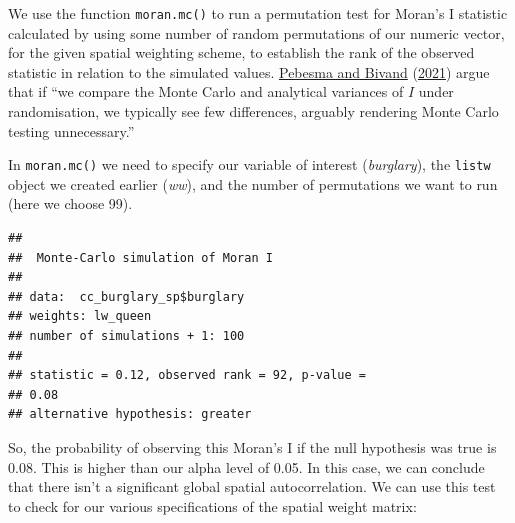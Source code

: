 \documentclass[
  krantz2]{krantz}
\makeatletter
\newenvironment{Shaded}{\begin{snugshade}}{\end{snugshade}}
\newcommand{\AttributeTok}[1]{\textcolor[rgb]{0.61,0.61,0.61}{#1}}
\newcommand{\CommentTok}[1]{\textcolor[rgb]{0.37,0.37,0.37}{\textit{#1}}}
\newcommand{\DecValTok}[1]{\textcolor[rgb]{0.06,0.06,0.06}{#1}}
\newcommand{\FunctionTok}[1]{\textcolor[rgb]{0,0,0}{#1}}
\newcommand{\NormalTok}[1]{#1}
\newcommand{\OtherTok}[1]{\textcolor[rgb]{0.37,0.37,0.37}{#1}}
\newcommand{\SpecialCharTok}[1]{\textcolor[rgb]{0,0,0}{#1}}
\newenvironment{kframe}{%
\medskip{}
\setlength{\fboxsep}{.8em}
 \def\at@end@of@kframe{}%
 \ifinner\ifhmode%
  \def\at@end@of@kframe{\end{minipage}}%
  \begin{minipage}{\columnwidth}%
 \fi\fi%
 \def\FrameCommand##1{\hskip\@totalleftmargin \hskip-\fboxsep
 \colorbox{shadecolor}{##1}\hskip-\fboxsep
     \hskip-\linewidth \hskip-\@totalleftmargin \hskip\columnwidth}%
 \MakeFramed {\advance\hsize-\width
   \@totalleftmargin\z@ \linewidth\hsize
   \@setminipage}}%
 {\par\unskip\endMakeFramed%
 \at@end@of@kframe}
\renewenvironment{Shaded}{\begin{kframe}}{\end{kframe}}
\makeatother
\begin{document}
We use the function \texttt{moran.mc()} to run a permutation test for Moran's I statistic calculated by using some number of random permutations of our numeric vector, for the given spatial weighting scheme, to establish the rank of the observed statistic in relation to the simulated values. \protect\hyperlink{ref-Pebesma_2021}{Pebesma and Bivand} (\protect\hyperlink{ref-Pebesma_2021}{2021}) argue that if ``we compare the Monte Carlo and analytical variances of \(I\) under randomisation, we typically see few differences, arguably rendering Monte Carlo testing unnecessary.''

In \texttt{moran.mc()} we need to specify our variable of interest (\emph{burglary}), the \texttt{listw} object we created earlier (\emph{ww}), and the number of permutations we want to run (here we choose 99).

\begin{Shaded}
\end{Shaded}

\begin{verbatim}
## 
##  Monte-Carlo simulation of Moran I
## 
## data:  cc_burglary_sp$burglary 
## weights: lw_queen  
## number of simulations + 1: 100 
## 
## statistic = 0.12, observed rank = 92, p-value =
## 0.08
## alternative hypothesis: greater
\end{verbatim}

So, the probability of observing this Moran's I if the null hypothesis was true is 0.08. This is higher than our alpha level of 0.05. In this case, we can conclude that there isn't a significant global spatial autocorrelation. We can use this test to check for our various specifications of the spatial weight matrix:

\begin{Shaded}
\end{Shaded}
\end{document}
